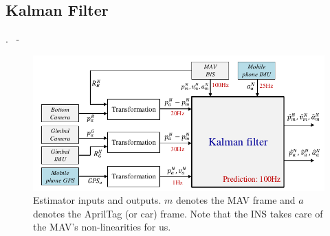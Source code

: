 
\subsection{Kalman Filter}
\begin{frame}{\thesection. \insertsection \ - \insertsubsection}
	\begin{figure}
		\includegraphics[width=0.85\paperwidth]{figures/kf.pdf}
		\caption{Estimator inputs and outputs. $m$ denotes the MAV frame and $a$ denotes the AprilTag (or car) frame.
		Note that the INS takes care of the MAV's non-linearities for us.}
	\end{figure}
\end{frame}





